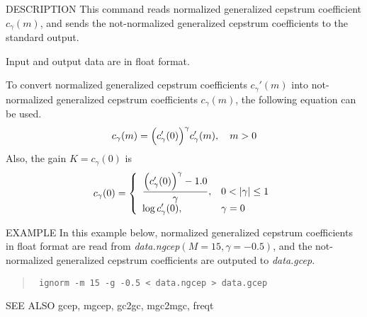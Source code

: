 \begin{qsection}{DESCRIPTION}
This command reads normalized generalized cepstrum coefficient
 $c_\gamma(m)$, and sends the not-normalized generalized
cepstrum coefficients to the standard output.
\par
Input and output data are in float format.
\par
To convert normalized generalized cepstrum coefficients
$c_\gamma'(m)$ into not-normalized generalized cepstrum coefficients
$c_\gamma(m)$, the following equation can be used.
\begin{displaymath}
c_\gamma(m) = \Bigl(c_\gamma'(0)\Bigr)^{\gamma} c_\gamma'(m), ~~~m>0
\end{displaymath}
Also, the gain $K = c_\gamma(0)$ is
\begin{displaymath}
c_\gamma(0) = \left\{
	\begin{array}{ll} \displaystyle
	  \frac{\Bigl(c_\gamma'(0)\Bigr)^{\gamma} - 1.0}{\gamma},
		& 0<|\gamma|\leq 1 \\ \displaystyle
	  \log c_\gamma'(0),  & \gamma=0
	\end{array} \right.
\end{displaymath}
\end{qsection}

\begin{options}
\end{options}

\begin{qsection}{EXAMPLE}
In this example below,
normalized generalized cepstrum coefficients in
float format are read from {\em data.ngcep}$(M=15, \gamma=-0.5)$,
and the not-normalized generalized cepstrum coefficients
are outputed to {\em data.gcep}.
\begin{quote}
 \verb! ignorm -m 15 -g -0.5 < data.ngcep > data.gcep!
\end{quote} 
\end{qsection}

\begin{qsection}{SEE ALSO}
 gcep, mgcep, gc2gc, mgc2mgc, freqt
\end{qsection}
